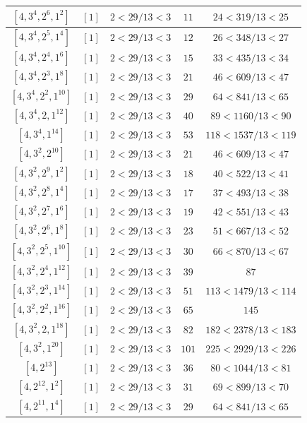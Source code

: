 \documentclass{article}%
\begin{document}
\begin{center}
\begin{longtable}{||c|c|c|c|c||}
$[4, 3^{4}, 2^{6}, 1^{2}]$ & $[1]$ & $2 < 29/13 < 3$ & $11$ & $24 < 319/13 < 25$ \\ \hline 
$[4, 3^{4}, 2^{5}, 1^{4}]$ & $[1]$ & $2 < 29/13 < 3$ & $12$ & $26 < 348/13 < 27$ \\ \hline 
$[4, 3^{4}, 2^{4}, 1^{6}]$ & $[1]$ & $2 < 29/13 < 3$ & $15$ & $33 < 435/13 < 34$ \\ \hline 
$[4, 3^{4}, 2^{3}, 1^{8}]$ & $[1]$ & $2 < 29/13 < 3$ & $21$ & $46 < 609/13 < 47$ \\ \hline 
$[4, 3^{4}, 2^{2}, 1^{10}]$ & $[1]$ & $2 < 29/13 < 3$ & $29$ & $64 < 841/13 < 65$ \\ \hline 
$[4, 3^{4}, 2, 1^{12}]$ & $[1]$ & $2 < 29/13 < 3$ & $40$ & $89 < 1160/13 < 90$ \\ \hline 
$[4, 3^{4}, 1^{14}]$ & $[1]$ & $2 < 29/13 < 3$ & $53$ & $118 < 1537/13 < 119$ \\ \hline 
$[4, 3^{2}, 2^{10}]$ & $[1]$ & $2 < 29/13 < 3$ & $21$ & $46 < 609/13 < 47$ \\ \hline 
$[4, 3^{2}, 2^{9}, 1^{2}]$ & $[1]$ & $2 < 29/13 < 3$ & $18$ & $40 < 522/13 < 41$ \\ \hline 
$[4, 3^{2}, 2^{8}, 1^{4}]$ & $[1]$ & $2 < 29/13 < 3$ & $17$ & $37 < 493/13 < 38$ \\ \hline 
$[4, 3^{2}, 2^{7}, 1^{6}]$ & $[1]$ & $2 < 29/13 < 3$ & $19$ & $42 < 551/13 < 43$ \\ \hline 
$[4, 3^{2}, 2^{6}, 1^{8}]$ & $[1]$ & $2 < 29/13 < 3$ & $23$ & $51 < 667/13 < 52$ \\ \hline 
$[4, 3^{2}, 2^{5}, 1^{10}]$ & $[1]$ & $2 < 29/13 < 3$ & $30$ & $66 < 870/13 < 67$ \\ \hline 
$[4, 3^{2}, 2^{4}, 1^{12}]$ & $[1]$ & $2 < 29/13 < 3$ & $39$ & $87$ \\ \hline 
$[4, 3^{2}, 2^{3}, 1^{14}]$ & $[1]$ & $2 < 29/13 < 3$ & $51$ & $113 < 1479/13 < 114$ \\ \hline 
$[4, 3^{2}, 2^{2}, 1^{16}]$ & $[1]$ & $2 < 29/13 < 3$ & $65$ & $145$ \\ \hline 
$[4, 3^{2}, 2, 1^{18}]$ & $[1]$ & $2 < 29/13 < 3$ & $82$ & $182 < 2378/13 < 183$ \\ \hline 
$[4, 3^{2}, 1^{20}]$ & $[1]$ & $2 < 29/13 < 3$ & $101$ & $225 < 2929/13 < 226$ \\ \hline 
$[4, 2^{13}]$ & $[1]$ & $2 < 29/13 < 3$ & $36$ & $80 < 1044/13 < 81$ \\ \hline 
$[4, 2^{12}, 1^{2}]$ & $[1]$ & $2 < 29/13 < 3$ & $31$ & $69 < 899/13 < 70$ \\ \hline 
$[4, 2^{11}, 1^{4}]$ & $[1]$ & $2 < 29/13 < 3$ & $29$ & $64 < 841/13 < 65$ \\ \hline 

\end{longtable}
\end{center}
\end{document}
